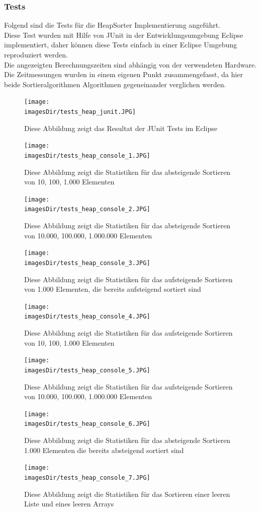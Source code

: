 \documentclass[11pt, a4paper, twoside]{article}   	%
\newcommand{\imagesDir}{images}
\newcommand{\testSection}{Tests}
\newcommand{\testCommonText}{Diese Test wurden mit Hilfe von JUnit in der Entwicklungsumgebung Eclipse implementiert, daher können diese Tests einfach in einer Eclipse Umgebung reproduziert werden.\\ 
Die angezeigten Berechnungszeiten sind abhängig von der verwendeten Hardware.}
\newcommand{\testSortCommonText}{
Die Zeitmessungen wurden in einem eigenen Punkt zusammengefasst, da hier beide Sortieralgorithmen Algorithmen gegeneinander verglichen werden.
}
\begin{document}
\subsubsection{\testSection}
Folgend sind die Tests für die HeapSorter Implementierung angeführt.\\
\testCommonText\\
\testSortCommonText
\begin{figure}[h]
  \centering
  \texttt{[image: \\imagesDir/tests\_heap\_junit.JPG]}
  \caption
   {Diese Abbildung zeigt das Resultat der JUnit Tests im Eclipse}
\end{figure}
\newpage
\begin{figure}[h]
  \centering
  \texttt{[image: \\imagesDir/tests\_heap\_console\_1.JPG]}
  \caption
   {Diese Abbildung zeigt die Statistiken für das absteigende Sortieren von 10, 100, 1.000 Elementen}
\end{figure}
\newpage
\begin{figure}[h]
  \centering
  \texttt{[image: \\imagesDir/tests\_heap\_console\_2.JPG]}
  \caption
   {Diese Abbildung zeigt die Statistiken für das absteigende Sortieren von 10.000, 100.000, 1.000.000 Elementen}
\end{figure}
\newpage
\begin{figure}[h]
  \centering
  \texttt{[image: \\imagesDir/tests\_heap\_console\_3.JPG]}
  \caption
   {Diese Abbildung zeigt die Statistiken für das aufsteigende Sortieren von 1.000 Elementen, die bereits aufsteigend sortiert sind}
\end{figure}
\newpage
\begin{figure}[h]
  \centering
  \texttt{[image: \\imagesDir/tests\_heap\_console\_4.JPG]}
  \caption
   {Diese Abbildung zeigt die Statistiken für das aufsteigende Sortieren von 10, 100, 1.000 Elementen}
\end{figure}
\newpage
\begin{figure}[h]
  \centering
  \texttt{[image: \\imagesDir/tests\_heap\_console\_5.JPG]}
  \caption
   {Diese Abbildung zeigt die Statistiken für das aufsteigende Sortieren von 10.000, 100.000, 1.000.000 Elementen}
\end{figure}
\newpage
\begin{figure}[h]
  \centering
  \texttt{[image: \\imagesDir/tests\_heap\_console\_6.JPG]}
  \caption
   {Diese Abbildung zeigt die Statistiken für das absteigende Sortieren 1.000 Elementen die bereits absteigend sortiert sind}
\end{figure}
\begin{figure}[h]
  \centering
  \texttt{[image: \\imagesDir/tests\_heap\_console\_7.JPG]}
  \caption
   {Diese Abbildung zeigt die Statistiken für das Sortieren einer leeren Liste und eines leeren Arrays}
\end{figure}
\newpage
\end{document}
